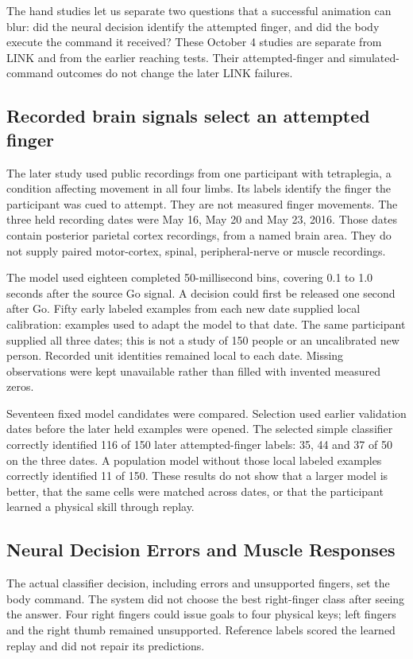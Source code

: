 The hand studies let us separate two questions that a successful animation can blur: did the neural decision identify the attempted finger, and did the body execute the command it received? These October 4 studies are separate from LINK and from the earlier reaching tests. Their attempted-finger and simulated-command outcomes do not change the later LINK failures.

\subsection{Recorded brain signals select an attempted finger}

The later study used public recordings from one participant with tetraplegia,
a condition affecting movement in all four limbs. Its labels identify the finger
the participant was cued to attempt. They are not measured finger movements.
The three held recording dates were May 16, May 20 and May 23, 2016. Those dates
contain posterior parietal cortex recordings, from a named brain area. They do
not supply paired motor-cortex, spinal, peripheral-nerve or muscle recordings.

The model used eighteen completed 50-millisecond bins, covering 0.1 to 1.0 seconds
after the source Go signal. A decision could first be released one second after
Go. Fifty early labeled examples from each new date supplied local calibration:
examples used to adapt the model to that date. The same participant supplied all
three dates; this is not a study of 150 people or an uncalibrated new person.
Recorded unit identities remained local to each date. Missing observations were
kept unavailable rather than filled with invented measured zeros.

Seventeen fixed model candidates were compared. Selection used earlier validation
dates before the later held examples were opened. The selected simple classifier
correctly identified 116 of 150 later attempted-finger labels: 35, 44 and 37 of
50 on the three dates. A population model without those local labeled examples
correctly identified 11 of 150. These results do not show that a larger model is
better, that the same cells were matched across dates, or that the participant
learned a physical skill through replay.

\subsection{Neural Decision Errors and Muscle Responses}

The actual classifier decision, including errors and unsupported fingers, set
the body command. The system did not choose the best right-finger class after
seeing the answer. Four right fingers could issue goals to four physical keys;
left fingers and the right thumb remained unsupported. Reference labels scored
the learned replay and did not repair its predictions.

